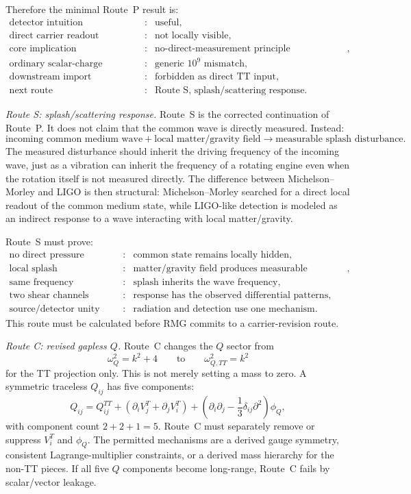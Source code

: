 \documentclass[11pt]{article}
\begin{document}
Therefore the minimal Route~P result is:
\[
\boxed{
\begin{array}{lll}
\text{detector intuition} &:& \text{useful},\\
\text{direct carrier readout} &:& \text{not locally visible},\\
\text{core implication} &:& \text{no-direct-measurement principle strengthened},\\
\text{ordinary scalar-charge warning} &:& \text{generic }10^9\text{ mismatch},\\
\text{downstream import} &:& \text{forbidden as direct TT input},\\
\text{next route} &:& \text{Route S, splash/scattering response}.
\end{array}}
\]

\medskip\noindent\textit{Route S: splash/scattering response.}
Route~S is the corrected continuation of Route~P.  It does not claim that the
common wave is directly measured.  Instead:
\[
\boxed{
\text{incoming common medium wave}
+\text{local matter/gravity field}
\longrightarrow
\text{measurable splash disturbance}.
}
\]
The measured disturbance should inherit the driving frequency of the incoming
wave, just as a vibration can inherit the frequency of a rotating engine even
when the rotation itself is not measured directly.  The difference between
Michelson--Morley and LIGO is then structural: Michelson--Morley searched for
a direct local readout of the common medium state, while LIGO-like detection
is modeled as an indirect response to a wave interacting with local
matter/gravity.

Route~S must prove:
\[
\boxed{
\begin{array}{lll}
\text{no direct pressure readout} &:& \text{common state remains locally hidden},\\
\text{local splash} &:& \text{matter/gravity field produces measurable disturbance},\\
\text{same frequency} &:& \text{splash inherits the wave frequency},\\
\text{two shear channels} &:& \text{response has the observed differential patterns},\\
\text{source/detector unity} &:& \text{radiation and detection use one mechanism}.
\end{array}}
\]
This route must be calculated before RMG commits to a carrier-revision route.

\medskip\noindent\textit{Route C: revised gapless \(Q\).}
Route~C changes the \(Q\) sector from
\[
\boxed{\omega_Q^2=k^2+4}
\qquad\text{to}\qquad
\boxed{\omega_{Q,TT}^2=k^2}
\]
for the TT projection only.  This is not merely setting a mass to zero.  A
symmetric traceless \(Q_{ij}\) has five components:
\[
\boxed{
Q_{ij}=Q^{TT}_{ij}
 +(\partial_i V^T_j+\partial_j V^T_i)
 +\left(\partial_i\partial_j-\frac13\delta_{ij}\partial^2\right)\phi_Q,
}
\]
with component count \(2+2+1=5\).  Route~C must separately remove or suppress
\(V^T_i\) and \(\phi_Q\).  The permitted mechanisms are a derived gauge
symmetry, consistent Lagrange-multiplier constraints, or a derived mass
hierarchy for the non-TT pieces.  If all five \(Q\) components become
long-range, Route~C fails by scalar/vector leakage.
\end{document}

